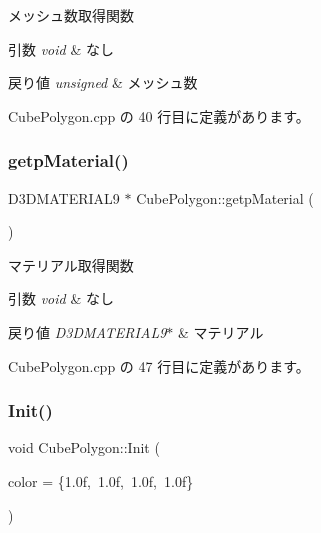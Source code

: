 メッシュ数取得関数 


\begin{DoxyParams}{引数}
{\em void} & なし \\
\hline
\end{DoxyParams}

\begin{DoxyRetVals}{戻り値}
{\em unsigned} & メッシュ数 \\
\hline
\end{DoxyRetVals}


 Cube\+Polygon.\+cpp の 40 行目に定義があります。

\mbox{\label{class_cube_polygon_a1f0d02ebec205f6263b1b10800505d32}} 
\subsubsection{\texorpdfstring{getp\+Material()}{getpMaterial()}}
{\footnotesize\ttfamily D3\+D\+M\+A\+T\+E\+R\+I\+A\+L9 $\ast$ Cube\+Polygon\+::getp\+Material (\begin{DoxyParamCaption}{ }\end{DoxyParamCaption})}



マテリアル取得関数 


\begin{DoxyParams}{引数}
{\em void} & なし \\
\hline
\end{DoxyParams}

\begin{DoxyRetVals}{戻り値}
{\em D3\+D\+M\+A\+T\+E\+R\+I\+A\+L9$\ast$} & マテリアル \\
\hline
\end{DoxyRetVals}


 Cube\+Polygon.\+cpp の 47 行目に定義があります。

\mbox{\label{class_cube_polygon_a2c1adca6cd359db7947118a326756411}} 
\subsubsection{\texorpdfstring{Init()}{Init()}}
{\footnotesize\ttfamily void Cube\+Polygon\+::\+Init (\begin{DoxyParamCaption}\item[{\mbox{\hyperlink{_vector3_d_8h_a680c30c4a07d86fe763c7e01169cd6cc}{X\+Color4}}}]{color = {\ttfamily \{1.0f,~1.0f,~1.0f,~1.0f\}} }\end{DoxyParamCaption})}




